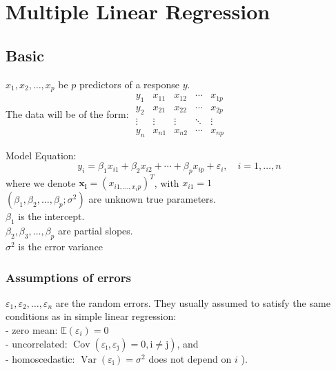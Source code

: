 \documentclass[11pt,a4paper]{article}
\begin{document}
\section{Multiple Linear Regression}
\subsection{Basic}
$x_{1}, x_{2}, \ldots, x_{p}$ be $p$ predictors of a response $y$.\\
The data will be of the form:
$\begin{array}{ccccc}y_{1} & x_{11} & x_{12} & \cdots & x_{1 p} \\ y_{2} & x_{21} & x_{22} & \cdots & x_{2 p} \\ \vdots & \vdots & \vdots & \ddots & \vdots \\ y_{n} & x_{n 1} & x_{n 2} & \cdots & x_{n p}\end{array}$

Model Equation:
$$
y_{i}=\beta_{1} x_{i 1}+\beta_{2} x_{i 2}+\cdots+\beta_{p} x_{i p}+\varepsilon_{i}, \quad i=1, \ldots, n
$$
where we denote $\mathbf{x}_{\mathbf{i}}=\left(x_{i 1, \ldots, x_{i} p}\right)^{T}$, with $x_{i 1}=1$\\
$\left(\beta_{1}, \beta_{2}, \ldots, \beta_{p} ; \sigma^{2}\right)$ are unknown true parameters.\\
$\beta_{1}$ is the intercept.\\
$\beta_{2}, \beta_{3}, \ldots, \beta_{p}$ are partial slopes.\\
$\sigma^{2}$ is the error variance
\subsubsection{Assumptions of errors}
$\varepsilon_{1}, \varepsilon_{2}, \ldots, \varepsilon_{n}$ are the random errors. They usually assumed to satisfy the same conditions as in simple linear regression:\\
- zero mean: $\mathbb{E}\left(\varepsilon_{i}\right)=0$\\
- uncorrelated: $\left.\operatorname{Cov}\left(\varepsilon_{\mathrm{i}}, \varepsilon_{\mathrm{j}}\right)=0, \mathrm{i} \neq \mathrm{j}\right)$, and\\
- homoscedastic: $\operatorname{Var}\left(\varepsilon_{\mathrm{i}}\right)=\sigma^{2}$ does not depend on $i$ ).
\end{document}
